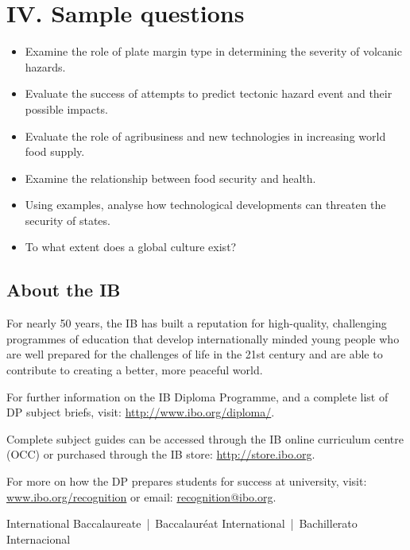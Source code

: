 \documentclass[11pt,a4paper]{article}
\begin{document}
\section*{IV. Sample questions}

\begin{itemize}
    \item Examine the role of plate margin type in determining the severity of
    volcanic hazards.
    \item Evaluate the success of attempts to predict tectonic hazard event
    and their possible impacts.
    \item Evaluate the role of agribusiness and new technologies in increasing
    world food supply.
    \item Examine the relationship between food security and health.
    \item Using examples, analyse how technological developments can threaten
    the security of states.
    \item To what extent does a global culture exist?
\end{itemize}

\subsection*{About the IB}

For nearly 50 years, the IB has built a reputation for high-quality, challenging
programmes of education that develop internationally minded young people who are
well prepared for the challenges of life in the 21st century and are able to
contribute to creating a better, more peaceful world.

For further information on the IB Diploma Programme, and a complete list of DP
subject briefs, visit: \url{http://www.ibo.org/diploma/}.

Complete subject guides can be accessed through the IB online curriculum centre
(OCC) or purchased through the IB store: \url{http://store.ibo.org}.

For more on how the DP prepares students for success at university, visit:
\url{www.ibo.org/recognition} or email:
\href{mailto:recognition@ibo.org}{recognition@ibo.org}.

\bigskip

\small
International Baccalaureate\textregistered{} \,|\, Baccalaur\'eat International\textregistered{} \,|\, Bachillerato Internacional\textregistered{}
\end{document}
